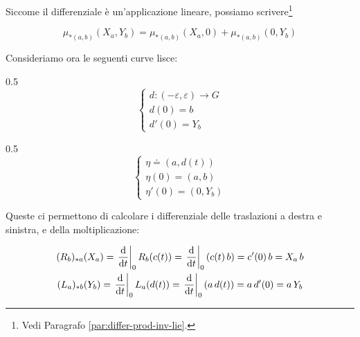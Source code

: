 Siccome il differenziale è un'applicazione lineare, possiamo scrivere\footnote{%
	Vedi Paragrafo \ref{par:differ-prod-inv-lie}.%
}

\begin{equation}
	\mu_{*(a,b)}(X_{a},Y_{b}) = \mu_{*(a,b)}(X_{a},0) + \mu_{*(a,b)}(0,Y_{b})
\end{equation}

Consideriamo ora le seguenti curve lisce:

	{0.5}{%
			\begin{equation}
				\begin{cases}
					d : (- \varepsilon, \varepsilon) \to G \\
					d(0) = b \\
					d'(0) = Y_{b}
				\end{cases}
			\end{equation}
			}

	{0.5}{%
			\begin{equation}
				\begin{cases}
					\eta \doteq (a, d(t)) \\
					\eta(0) = (a,b) \\
					\eta'(0) = (0, Y_{b})
				\end{cases}
			\end{equation}
			}

Queste ci permettono di calcolare i differenziale delle traslazioni a destra e sinistra, e della moltiplicazione:

\begin{gather}
	(R_{b})_{*a}(X_{a}) = \eval{ \dv{t} }_{0} R_{b}(c(t)) %
	= \eval{ \dv{t} }_{0} (c(t) \, b) %
	= c'(0) \, b %
	= X_{a} \, b \\
	(L_{a})_{*b}(Y_{b}) = \eval{ \dv{t} }_{0} L_{a}(d(t)) %
	= \eval{ \dv{t} }_{0} (a \, d(t)) %
	= a \, d'(0) %
	= a \, Y_{b}
\end{gather}

